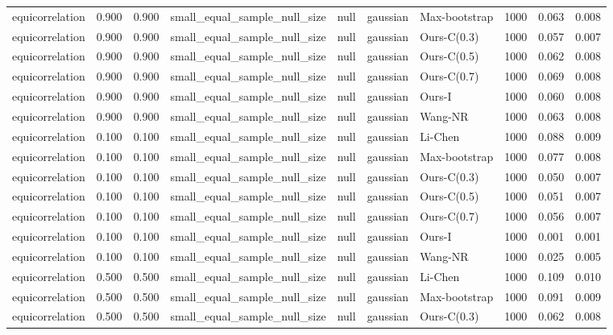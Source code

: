 \begin{tabular}{lrrllllrrr}
equicorrelation & 0.900 & 0.900 & small\_equal\_sample\_null\_size & null & gaussian & Max-bootstrap & 1000 & 0.063 & 0.008 \\
equicorrelation & 0.900 & 0.900 & small\_equal\_sample\_null\_size & null & gaussian & Ours-C(0.3) & 1000 & 0.057 & 0.007 \\
equicorrelation & 0.900 & 0.900 & small\_equal\_sample\_null\_size & null & gaussian & Ours-C(0.5) & 1000 & 0.062 & 0.008 \\
equicorrelation & 0.900 & 0.900 & small\_equal\_sample\_null\_size & null & gaussian & Ours-C(0.7) & 1000 & 0.069 & 0.008 \\
equicorrelation & 0.900 & 0.900 & small\_equal\_sample\_null\_size & null & gaussian & Ours-I & 1000 & 0.060 & 0.008 \\
equicorrelation & 0.900 & 0.900 & small\_equal\_sample\_null\_size & null & gaussian & Wang-NR & 1000 & 0.063 & 0.008 \\
equicorrelation & 0.100 & 0.100 & small\_equal\_sample\_null\_size & null & gaussian & Li-Chen & 1000 & 0.088 & 0.009 \\
equicorrelation & 0.100 & 0.100 & small\_equal\_sample\_null\_size & null & gaussian & Max-bootstrap & 1000 & 0.077 & 0.008 \\
equicorrelation & 0.100 & 0.100 & small\_equal\_sample\_null\_size & null & gaussian & Ours-C(0.3) & 1000 & 0.050 & 0.007 \\
equicorrelation & 0.100 & 0.100 & small\_equal\_sample\_null\_size & null & gaussian & Ours-C(0.5) & 1000 & 0.051 & 0.007 \\
equicorrelation & 0.100 & 0.100 & small\_equal\_sample\_null\_size & null & gaussian & Ours-C(0.7) & 1000 & 0.056 & 0.007 \\
equicorrelation & 0.100 & 0.100 & small\_equal\_sample\_null\_size & null & gaussian & Ours-I & 1000 & 0.001 & 0.001 \\
equicorrelation & 0.100 & 0.100 & small\_equal\_sample\_null\_size & null & gaussian & Wang-NR & 1000 & 0.025 & 0.005 \\
equicorrelation & 0.500 & 0.500 & small\_equal\_sample\_null\_size & null & gaussian & Li-Chen & 1000 & 0.109 & 0.010 \\
equicorrelation & 0.500 & 0.500 & small\_equal\_sample\_null\_size & null & gaussian & Max-bootstrap & 1000 & 0.091 & 0.009 \\
equicorrelation & 0.500 & 0.500 & small\_equal\_sample\_null\_size & null & gaussian & Ours-C(0.3) & 1000 & 0.062 & 0.008 \\

\end{tabular}
